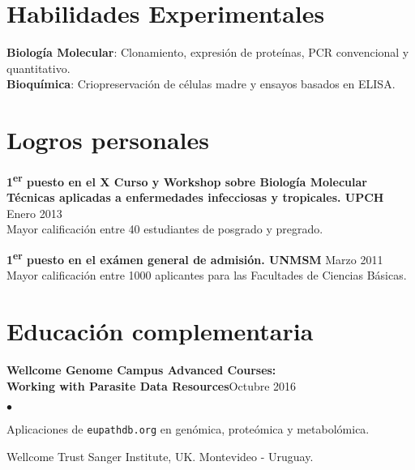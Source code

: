 \documentclass[margin,line]{res}
\newenvironment{list2}{
	\begin{list}{$\bullet$}{%
			\setlength{\itemsep}{0in}
			\setlength{\parsep}{0in} \setlength{\parskip}{0in}
			\setlength{\topsep}{0in} \setlength{\partopsep}{0in}
			\setlength{\leftmargin}{0.2in}}}{\end{list}}
\begin{document}
\begin{resume}
		\section{\sc Habilidades Experimentales}
		{\bf Biología Molecular}: Clonamiento, expresión de proteínas, PCR convencional y quantitativo.\\
		{\bf Bioquímica}: Criopreservación de células madre y ensayos basados en ELISA.\\
		
		\newpage
		
		\section{\sc Logros personales}
		
		{\bf 1\textsuperscript{er} puesto en el X Curso y Workshop sobre Biología Molecular \\Técnicas aplicadas a enfermedades infecciosas y tropicales. UPCH} \hfill Enero 2013\\
		Mayor calificación entre 40 estudiantes de posgrado y pregrado.
		
		{\bf 1\textsuperscript{er} puesto en el exámen general de admisión. UNMSM} \hfill Marzo 2011\\
		Mayor calificación entre 1000 aplicantes para las Facultades de Ciencias Básicas.\\
		
		\section{\sc Educación complementaria}
		
		{\bf Wellcome Genome Campus Advanced Courses:\\Working with Parasite Data Resources}\hfill {Octubre 2016}\\
		\vspace*{-.1in}%
		\begin{list2} %
			\item Aplicaciones de \texttt{eupathdb.org} en genómica, proteómica y metabolómica.
			\item Wellcome Trust Sanger Institute, UK. Montevideo - Uruguay.
		\end{list2}
		

\end{resume}
\end{document}
